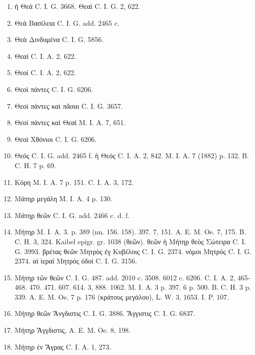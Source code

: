 \documentclass[a4paper, 11pt, oneside, polutonikogreek, german]{article}
\begin{document}
\begin{enumerate}
\item ἡ Θεά C. I. G. 3668. Θεαί C. I. G. 2, 622.

\item Θεὰ Βασίλεια C. I. G. add. 2465 c.

\item Θεὰ Δινδυμένα C. I. G. 5856.

\item Θεαί C. I. A. 2, 622.

\item Θεοί C. I. A. 2, 622.

\item Θεοὶ πάντες C. I. G. 6206.

\item Θεοὶ πάντες καὶ πᾶσαι C. I. G. 3657.

\item Θεοὶ πάντες καὶ Θεαί M. I. A. 7, 651.

\item Θεοὶ Χθόνιοι C. I. G. 6206.

\item Θεός C. I. G. add. 2465 f. ἡ Θεός C. I. A. 2, 842. M. I. A. 7 (1882) p. 132. B. C. H. 7 p. 69.

\item Κόρη M. I. A. 7 p. 151. C. I. A. 3, 172.

\item Μάτηρ μεγάλη M. I. A. 4 p. 130.

\item Μάτηρ θεῶν C. I. G. add. 2466 c. d. f.

\item Μήτηρ M. I. A. 3. p. 389 (nn. 156. 158). 397. 7, 151. A. E. M. Oe. 7, 175. B. C. H. 3, 324. Kaibel epigr. gr. 1038 (θεῶν). θεῶν ἡ Μήτηρ θεὸς Σώτειρα C. I. G. 3993. βρέτας θεῶν Μητρὸς ἐγ Κυβέλοις C. I. G. 2374. νόμοι Μητρός C. I. G. 2374. αἱ ἱεραὶ Μητρός ὁδοί C. I. G. 3156.

\item Μήτηρ τῶν θεῶν C. I. G. 487. add. 2010 c. 3508. 6012 c. 6206. C. I. A. 2, 465-468. 470. 471. 607. 614. 3, 888. 1062. M. I. A. 3 p. 397. 6 p. 500. B. C. H. 3 p. 339. A. E. M. Oe. 7 p. 176 (κράτους μεγάλου), L. W. 3, 1653. I. P. 107.

\item Μήτηρ θεῶν Ἄνγδιστις C. I. G. 3886. Ἄγγιστις C. I. G. 6837.

\item Μήτηρ Ἄγγδιστις, A. E. M. Oe. 8, 198.

\item Μήτηρ ἐν Ἄγρας C. I. A. 1, 273.


\end{enumerate}
\end{document}
